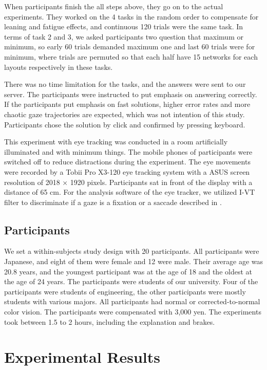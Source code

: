 \documentclass{llncs}
\begin{document}
When participants finish the all steps above, they go on to the actual experiments.
They worked on the 4 tasks in the random order to compensate for leaning and fatigue effects, and continuous 120 trials were the same task.
In terms of task 2 and 3, we asked participants two question that maximum or minimum, so early 60 trials demanded maximum one and last 60 trials were for minimum, where trials are permuted so that each half have 15 networks for each layouts respectively in these tasks.

There was no time limitation for the tasks, and the answers were sent to our server.
The participants were instructed to put emphasis on answering correctly.
If the participants put emphasis on fast solutions, higher error rates and more chaotic gaze trajectories are expected, which was not intention of this study.
Participants chose the solution by click and confirmed by pressing keyboard.

This experiment with eye tracking was conducted in a room artificially illuminated and with minimum things.
The mobile phones of participants were switched off to reduce distractions during the experiment.
The eye movements were recorded by a Tobii Pro X3-120 eye tracking system with a ASUS screen resolution of 2018 × 1920 pixels. Participants sat in front of the display with a distance of 65 cm. For the analysis software of the eye tracker, we utilized I-VT filter to discriminate if a gaze is a fixation or a saccade described in \cite{tobii}. 

\subsection{Participants}

We set a within-subjects study design with 20 participants.
All participants were Japanese, and eight of them were female and 12 were male.
Their average age was 20.8 years, and the youngest participant was at the age of 18 and the oldest at the age of 24 years.
The participants were students of our university.
Four of the participants were students of engineering, the other participants were mostly students with various majors.
All participants had normal or corrected-to-normal color vision.
The participants were compensated with 3,000 yen.
The experiments took between 1.5 to 2 hours, including the explanation and brakes. 

\section{Experimental Results}
\end{document}
